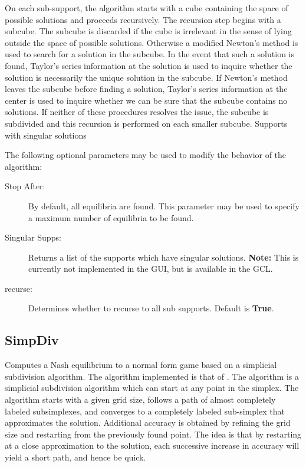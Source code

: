 On each sub-support, the algorithm starts with a cube containing the
space of possible solutions and proceeds recursively.  The recursion
step begins with a subcube.  The subcube is discarded if the cube is
irrelevant in the sense of lying outside the space of possible
solutions.  Otherwise a modified Newton's method is used to search for
a solution in the subcube.  In the event that such a solution is
found, Taylor's series information at the solution is used to inquire
whether the solution is necessarily the unique solution in the
subcube.  If Newton's method leaves the subcube before finding a
solution, Taylor's series information at the center is used to inquire
whether we can be sure that the subcube contains no solutions.  If
neither of these procedures resolves the issue, the subcube is
subdivided and this recursion is performed on each smaller subcube.
Supports with singular solutions 

The following optional parameters may be used to modify the behavior
of the algorithm:

\begin{description}
\item[Stop After:] By default, all equilibria are found.  This
parameter may be used to specify a maximum number of equilibria to be
found.
\item[Singular Supps:] Returns a list of the supports which have
singular solutions. {\bf Note:} This is currently not implemented in
the GUI, but is available in the GCL.
\item[recurse:] Determines whether to recurse to all sub supports.
Default is {\bf True}. 
\end{description}

\subsection{SimpDiv}\label{SimpDiv}
Computes a Nash equilibrium to a normal form game based on a
simplicial subdivision algorithm.  The algorithm implemented is that
of \cite{VTH:1987}.  The algorithm is a simplicial subdivision
algorithm which can start at any point in the simplex.  The algorithm
starts with a given grid size, follows a path of almost completely
labeled subsimplexes, and converges to a completely labeled
sub-simplex that approximates the solution.  Additional accuracy is
obtained by refining the grid size and restarting from the previously
found point.  The idea is that by restarting at a close approximation
to the solution, each successive increase in accuracy will yield a
short path, and hence be quick.

